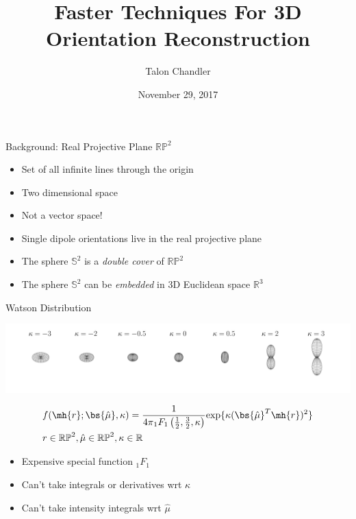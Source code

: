 \documentclass[presentation]{beamer}
\author{Talon Chandler}
\date{November 29, 2017}
\title{Faster Techniques For 3D Orientation Reconstruction}
\begin{document}
\maketitle
\begin{frame}[label=sec-1]{Background: Real Projective Plane $\mathbb{RP}^2$}
\begin{itemize}
\item Set of all infinite lines through the origin
\item Two dimensional space
\item Not a vector space! 
\item Single dipole orientations live in the real projective plane 
\item The sphere $\mathbb{S}^2$ is a \textit{double cover} of $\mathbb{RP}^2$ 
\item The sphere $\mathbb{S}^2$ can be \textit{embedded} in 3D Euclidean space $\mathbb{R}^3$ 
\end{itemize}
\end{frame}
\begin{frame}[label=sec-2]{Watson Distribution}
\begin{center}
  \includegraphics[width=1.0\textwidth, interpolate=true]{figs/watson.pdf}\\
\end{center}
\begin{align*}
  &f(\mh{r}; \bs{\hat{\mu}}, \kappa) = \frac{1}{4\pi{}_1F_1\left(\frac{1}{2}, \frac{3}{2}, \kappa\right)}\text{exp}\{\kappa (\bs{\hat{\mu}}^T\mh{r})^2\}\\
  &r \in \mathbb{RP}^2, \hat{\mu} \in \mathbb{RP}^2, \kappa \in \mathbb{R}
\end{align*}
\begin{itemize}
\item Expensive special function ${}_1F_1$
\item Can't take integrals or derivatives wrt $\kappa$
\item Can't take intensity integrals wrt $\hat{\mu}$
\end{itemize}
\end{frame}
\end{document}
